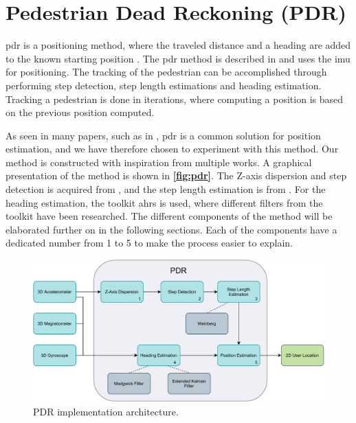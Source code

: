 \section{Pedestrian Dead Reckoning (PDR)} \label{sec:pdr}

\gls{pdr} is a positioning method, where the traveled distance and a heading are added to the known starting position \cite{pdr_smartphonebased}. The \gls{pdr} method is described in \cite{HybridPositioningPaper} and uses the \gls{imu} for positioning. The tracking of the pedestrian can be accomplished through performing step detection, step length estimations and heading estimation. Tracking a pedestrian is done in iterations, where computing a position is based on the previous position computed.

As seen in many papers, such as in \cite{pdr_smartphonebased, HybridPositioningPaper, 6987239, 6782540}, \gls{pdr} is a common solution for position estimation, and we have therefore chosen to experiment with this method. Our method is constructed with inspiration from multiple works. A graphical presentation of the method is shown in \textbf{\autoref{fig:pdr}}. The Z-axis dispersion and step detection is acquired from \cite{peakdetection}, and the step length estimation is from \cite{HybridPositioningPaper}. For the heading estimation, the toolkit \gls{ahrs} is used, where different filters from the toolkit have been researched. The different components of the method will be elaborated further on in the following sections. Each of the components have a dedicated number from 1 to 5 to make the process easier to explain. 
\\

\begin{figure}[H]
    \centering
    \includegraphics[scale=0.7]{Images/Experiments/pdr.pdf}
    \caption{PDR implementation architecture.}
     \label{fig:pdr}
\end{figure}

